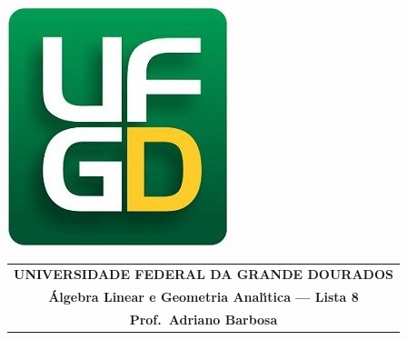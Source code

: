 \documentclass[a4paper,5pt]{amsbook}
\begin{document}
\thispagestyle{empty}
\pagestyle{empty}
\begin{minipage}[h]{0.14\textwidth}
	\includegraphics[scale=0.24]{../../ufgd.png}
\end{minipage}
\begin{minipage}[h]{\textwidth}
\begin{tabular}{c}
{{\bf UNIVERSIDADE FEDERAL DA GRANDE DOURADOS}}\\
{{\bf \'{A}lgebra Linear e Geometria Anal\'{\i}tica --- Lista 8}}\\
{{\bf Prof.\ Adriano Barbosa}}\\
\end{tabular}
\vspace{-0.45cm}
%
\end{minipage}

\end{document}
